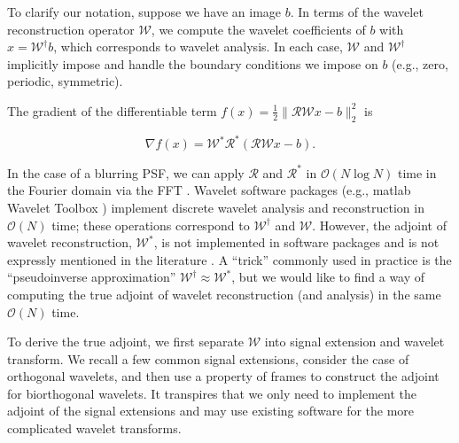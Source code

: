 \documentclass[journal]{IEEEtran}
\begin{document}
To clarify our notation, suppose we have an image $b$.  In terms of the wavelet reconstruction operator $\mathcal{W}$, we compute the wavelet coefficients of $b$ with $x=\mathcal{W}^\dagger b$, which corresponds to wavelet analysis.  In each case, $\mathcal{W}$ and $\mathcal{W}^\dagger$ implicitly impose and handle the boundary conditions we impose on $b$ (e.g., zero, periodic, symmetric).

The gradient of the differentiable term $f(x)={\frac{1}{2}\|\mathcal{RW}x-b\|_2^2}$ is

\[ \nabla f(x) = \mathcal{W}^\ast \mathcal{R}^\ast(\mathcal{RW}x-b). \] 

\noindent In the case of a blurring PSF, we can apply $\mathcal{R}$ and $\mathcal{R}^\ast$ in $\mathcal{O}(N\log N)$ time in the Fourier domain via the FFT \cite{beck_2009, hansen_2006}.  Wavelet software packages (e.g., {\sc matlab} Wavelet Toolbox \cite{matlab_wt_2015}) implement discrete wavelet analysis and reconstruction in $\mathcal{O}(N)$ time; these operations correspond to $\mathcal{W}^\dagger$ and $\mathcal{W}$.  However, the adjoint of wavelet reconstruction, $\mathcal{W}^\ast$, is not implemented in software packages and is not expressly mentioned in the literature \cite{mallat_2009, daubechies_1992, strang_1996}.  A ``trick'' commonly used in practice is the ``pseudoinverse approximation'' $\mathcal{W}^\dagger\approx\mathcal{W}^\ast$, but we would like to find a way of computing the true adjoint of wavelet reconstruction (and analysis) in the same $\mathcal{O}(N)$ time. 



To derive the true adjoint, we first separate $\mathcal{W}$ into signal extension and wavelet transform.  We recall a few common signal extensions, consider the case of orthogonal wavelets, and then use a property of frames to construct the adjoint for biorthogonal wavelets.  It transpires that we only need to implement the adjoint of the signal extensions and may use existing software for the more complicated wavelet transforms.
\end{document}
